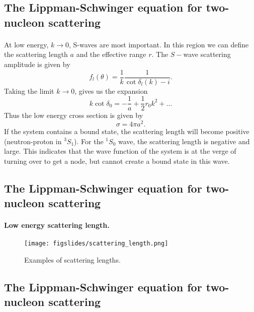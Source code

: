 \documentclass[%
twoside,                 %
final,                   %
10pt]{article}
\begin{document}
\subsection*{The Lippman-Schwinger equation for two-nucleon scattering}

\paragraph{}

At low energy, $k \rightarrow 0$, S-waves are most important. In this region we can define the scattering length $a$ and the effective range $r$. The $S-$wave scattering amplitude is given by
\[
f_l(\theta) = \frac{1}{k}\frac{1}{\cot \delta_l(k) - i}.
\]
Taking the limit $k \rightarrow 0$, gives us the expansion
\[
k \cot \delta_0 = -\frac{1}{a} + \frac{1}{2}r_0 k^2 + \ldots
\]
Thus the low energy cross section is given by
\[
\sigma = 4\pi a^2.
\]
If the system contains a bound state, the scattering length will become positive (neutron-proton in $^3S_1$). For the $^1S_0$ wave, the scattering length is negative and large. This indicates that the wave function of the system is at the verge of turning over to get a node, but cannot create a bound state in this wave.



\subsection*{The Lippman-Schwinger equation for two-nucleon scattering}

\paragraph{Low energy scattering length.}

\begin{figure}[ht]
  \centerline{\texttt{[image: figslides/scattering\_length.png]}}
  \caption{
  Examples of scattering lengths.
  }
\end{figure}



\subsection*{The Lippman-Schwinger equation for two-nucleon scattering}
\end{document}
